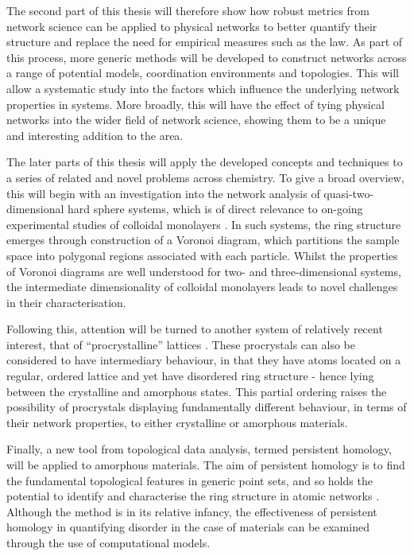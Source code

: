 The second part of this thesis will therefore show how robust metrics from network science can be applied to physical \td{} networks to better quantify their structure and replace the need for empirical measures such as the \aw{} law.
As part of this process, more generic methods will be developed to construct \td{} networks across a range of potential models, coordination environments and topologies.
This will allow a systematic study into the factors which influence the underlying network properties in \td{} systems.
More broadly, this will have the effect of tying physical \td{} networks into the wider field of network science, showing them to be a unique and interesting addition to the area.

The later parts of this thesis will apply the developed concepts and techniques to a series of related and novel problems across chemistry.
To give a broad overview, this will begin with an investigation into the network analysis of quasi\--two\--dimensional hard sphere systems, which is of direct relevance to on\--going experimental studies of colloidal monolayers \cite{Thorneywork2017}.
In such systems, the ring structure emerges through construction of a Voronoi diagram, which partitions the sample space into polygonal regions associated with each particle.
Whilst the properties of Voronoi diagrams are well understood for two\-- and three\--dimensional systems, the intermediate dimensionality of colloidal monolayers leads to novel challenges in their characterisation.

Following this, attention will be turned to another system of relatively recent interest, that of ``procrystalline'' lattices \cite{Overy2016}.
These procrystals can also be considered to have intermediary behaviour, in that they have atoms located on a regular, ordered lattice and yet have disordered ring structure - hence lying between the crystalline and amorphous states.
This partial ordering raises the possibility of procrystals displaying fundamentally different behaviour, in terms of their network properties, to either crystalline or amorphous materials.

Finally, a new tool from topological data analysis, termed persistent homology, will be applied to \td{} amorphous materials.
The aim of persistent homology is to find the fundamental topological features in generic point sets, and so holds the potential to identify and characterise the ring structure in atomic networks \cite{Wasserman2018}.
Although the method is in its relative infancy, the effectiveness of persistent homology in quantifying disorder in the case of \td{} materials can be examined through the use of computational models.

